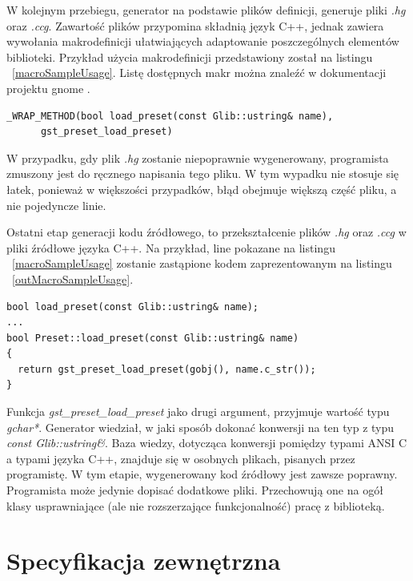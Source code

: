 \documentclass[12pt]{article}
\begin{document}
W kolejnym przebiegu, generator na podstawie plików definicji, generuje pliki \textit{.hg} oraz \textit{.ccg}. Zawartość plików przypomina składnią język C++, jednak zawiera wywołania makrodefinicji ułatwiających adaptowanie poszczególnych elementów biblioteki. Przykład użycia makrodefinicji przedstawiony został na listingu ~\ref{macroSampleUsage}.
Listę dostępnych makr można znaleźć w dokumentacji projektu gnome \cite{devgnomepage}.
    \begin{lstlisting}[caption=Przykład użycia makrodefinicji w pliku \textit{.hg}, label=macroSampleUsage]
_WRAP_METHOD(bool load_preset(const Glib::ustring& name), 
      gst_preset_load_preset)
    \end{lstlisting}
    W przypadku, gdy plik \textit{.hg} zostanie niepoprawnie wygenerowany, programista zmuszony jest do ręcznego napisania tego pliku. W tym wypadku nie stosuje się łatek, ponieważ w większości przypadków, błąd obejmuje większą część pliku, a nie pojedyncze linie.

Ostatni etap generacji kodu źródłowego, to przekształcenie plików \textit{.hg} oraz \textit{.ccg} w pliki źródłowe języka C++. Na przykład, line pokazane na listingu ~\ref{macroSampleUsage} zostanie zastąpione kodem zaprezentowanym na listingu ~\ref{outMacroSampleUsage}.
    \begin{lstlisting}[caption=Kod źródłowy wygenerowany na podstawie makrodefinicji, label=outMacroSampleUsage]
bool load_preset(const Glib::ustring& name);
...
bool Preset::load_preset(const Glib::ustring& name)
{
  return gst_preset_load_preset(gobj(), name.c_str());
}
    \end{lstlisting}
    Funkcja \textit{gst\_preset\_load\_preset} jako drugi argument, przyjmuje wartość typu \textit{gchar*}. Generator wiedział, w jaki sposób dokonać konwersji na ten typ z typu \textit{const Glib::ustring\&}. Baza wiedzy, dotycząca konwersji pomiędzy typami ANSI C a typami języka C++, znajduje się w osobnych plikach, pisanych przez programistę.
W tym etapie, wygenerowany kod źródłowy jest zawsze poprawny. Programista może jedynie dopisać dodatkowe pliki. Przechowują one na ogół klasy usprawniające (ale nie rozszerzające funkcjonalność) pracę z biblioteką.
\cleardoublepage
\section{Specyfikacja zewnętrzna}
\end{document}
